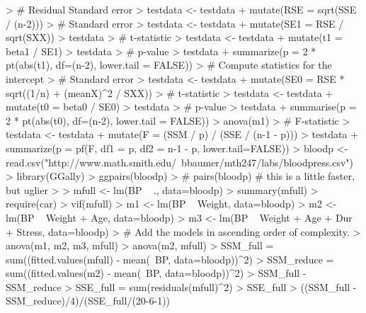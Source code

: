 \documentclass[10pt]{article}
\begin{document}
\begin{Schunk}
\begin{Sinput}
> # Residual Standard error
> testdata <- testdata %>% 
+   mutate(RSE = sqrt(SSE / (n-2)))
> # Standard error 
> testdata <- testdata %>%
+   mutate(SE1 = RSE / sqrt(SXX))
> testdata %>% glimpse()
> # t-statistic
> testdata <- testdata %>%
+   mutate(t1 = beta1 / SE1)
> testdata %>% glimpse()
> # p-value
> testdata %>%
+   summarize(p = 2 * pt(abs(t1), df=(n-2), lower.tail = FALSE))
> # Compute statistics for the intercept
> # Standard error 
> testdata <- testdata %>%
+   mutate(SE0 = RSE * sqrt((1/n) + (meanX)^2 / SXX))
> # t-statistic
> testdata <- testdata %>%
+   mutate(t0 = beta0 / SE0)
> testdata %>% glimpse()
> # p-value
> testdata %>%
+   summarise(p = 2 * pt(abs(t0), df=(n-2), lower.tail = FALSE))
> anova(m1)
> # F-statistic
> testdata <- testdata %>%
+   mutate(F = (SSM / p) / (SSE / (n-1 - p)))
> testdata %>%
+   summarize(p = pf(F, df1 = p, df2 = n-1 - p, lower.tail=FALSE))
> bloodp <- read.csv("http://www.math.smith.edu/~bbaumer/mth247/labs/bloodpress.csv")
> library(GGally)
> ggpairs(bloodp)
> # pairs(bloodp) # this is a little faster, but uglier 
> 
> mfull <- lm(BP ~ ., data=bloodp)
> summary(mfull)
> require(car)
> vif(mfull)
> m1 <- lm(BP ~ Weight, data=bloodp)
> m2 <- lm(BP ~ Weight +  Age, data=bloodp)
> m3 <- lm(BP ~ Weight +  Age + Dur + Stress, data=bloodp)
> # Add the models in ascending order of complexity.
> anova(m1, m2, m3, mfull)
> anova(m2, mfull)
> SSM_full = sum((fitted.values(mfull) - mean(~BP, data=bloodp))^2)
> SSM_reduce = sum((fitted.values(m2) - mean(~BP, data=bloodp))^2)
> SSM_full - SSM_reduce
> SSE_full = sum(residuals(mfull)^2)
> SSE_full
> ((SSM_full - SSM_reduce)/4)/(SSE_full/(20-6-1))
\end{Sinput}
\end{Schunk}
\end{document}
